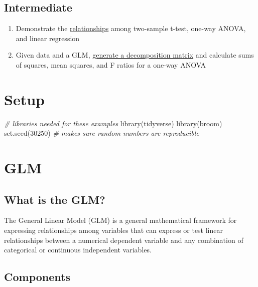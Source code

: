 \documentclass[
  oneside]{book}
\newenvironment{Shaded}{\begin{snugshade}}{\end{snugshade}}
\newcommand{\CommentTok}[1]{\textcolor[rgb]{0.56,0.35,0.01}{\textit{#1}}}
\newcommand{\DecValTok}[1]{\textcolor[rgb]{0.00,0.00,0.81}{#1}}
\newcommand{\FunctionTok}[1]{\textcolor[rgb]{0.00,0.00,0.00}{#1}}
\newcommand{\NormalTok}[1]{#1}
\providecommand{\tightlist}{%
  \setlength{\itemsep}{0pt}\setlength{\parskip}{0pt}}
\begin{document}
\hypertarget{intermediate-4}{%
\subsection*{Intermediate}\label{intermediate-4}}

\begin{enumerate}
\def\labelenumi{\arabic{enumi}.}
\setcounter{enumi}{6}
\tightlist
\item
  Demonstrate the \protect\hyperlink{test-rels}{relationships} among two-sample t-test, one-way ANOVA, and linear regression
\item
  Given data and a GLM, \protect\hyperlink{decomp}{generate a decomposition matrix} and calculate sums of squares, mean squares, and F ratios for a one-way ANOVA
\end{enumerate}

\hypertarget{setup-glm}{%
\section{Setup}\label{setup-glm}}

\begin{Shaded}
\begin{Highlighting}[]
\CommentTok{\# libraries needed for these examples}
\FunctionTok{library}\NormalTok{(tidyverse)}
\FunctionTok{library}\NormalTok{(broom)}
\FunctionTok{set.seed}\NormalTok{(}\DecValTok{30250}\NormalTok{) }\CommentTok{\# makes sure random numbers are reproducible}
\end{Highlighting}
\end{Shaded}

\hypertarget{glm-1}{%
\section{GLM}\label{glm-1}}

\hypertarget{what-is-the-glm}{%
\subsection{What is the GLM?}\label{what-is-the-glm}}

The General Linear Model (GLM) is a general mathematical framework for expressing relationships among variables that can express or test linear relationships between a numerical dependent variable and any combination of categorical or continuous independent variables.

\hypertarget{glm-components}{%
\subsection{Components}\label{glm-components}}
\end{document}
